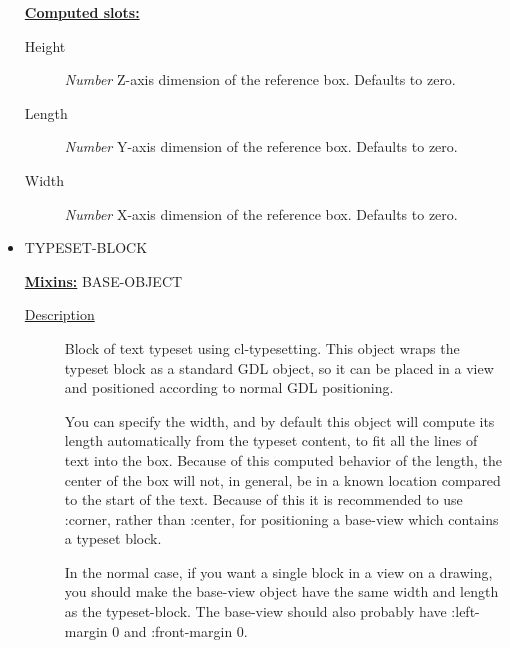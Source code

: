 \documentclass [11pt]{book}
\begin{document}
\begin{itemize}
\textbf{
\underline{Computed slots:}}

\begin{description}

\item [Height]
\emph{Number} Z-axis dimension of the reference box. Defaults to zero.


\item [Length]
\emph{Number} Y-axis dimension of the reference box. Defaults to zero.


\item [Width]
\emph{Number} X-axis dimension of the reference box. Defaults to zero.


\end{description}







\item {}TYPESET-BLOCK


\textbf{
\underline{Mixins:}} BASE-OBJECT





\begin{description}

\item [
\underline{Description}]


Block of text typeset using cl-typesetting. This object
wraps the typeset block as a standard GDL object, so it can be placed in a view and 
positioned according to normal GDL positioning.

You can specify the width, and by default this object will compute its length automatically 
from the typeset content, to fit all the lines of text into the box. Because of this 
computed behavior of the length, the center of the box will not, in general, be in a 
known location compared to the start of the text. Because of this it is recommended
to use :corner, rather than :center, for positioning a base-view which contains
a typeset block. 

In the normal case, if you want a single block in a view on a drawing, you should
make the base-view object have the same width and length as the typeset-block. The
base-view should also probably have :left-margin 0 and :front-margin 0.



\end{description}









\end{itemize}
\end{document}
